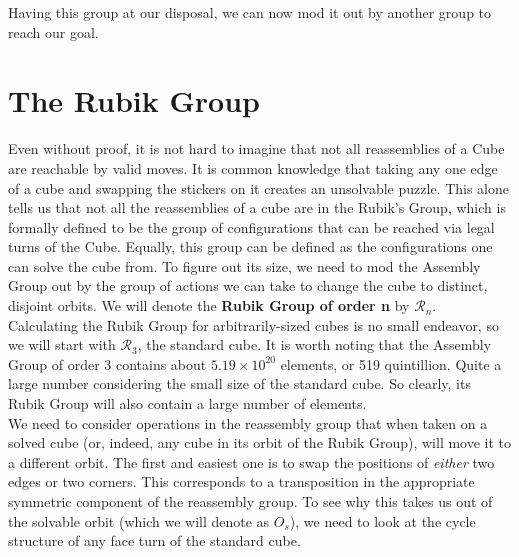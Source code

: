 \documentclass[10pt,letterpaper]{report}
\begin{document}
Having this group at our disposal, we can now mod it out by another group to reach our goal.
\section{The Rubik Group}
Even without proof, it is not hard to imagine that not all reassemblies of a Cube are reachable by valid moves.  It is common knowledge that taking any one edge of a cube and swapping the stickers on it creates an unsolvable puzzle.  This alone tells us that not all the reassemblies of a cube are in the Rubik's Group, which is formally defined to be the group of configurations that can be reached via legal turns of the Cube.  Equally, this group can be defined as the configurations one can solve the cube from.  To figure out its size, we need to mod the Assembly Group out by the group of actions we can take to change the cube to distinct, disjoint orbits.  We will denote the \textbf{Rubik Group of order n} by $\mathcal{R}_n$. \\

Calculating the Rubik Group for arbitrarily-sized cubes is no small endeavor, so we will start with $\mathcal{R}_3$, the standard cube.  It is worth noting that the Assembly Group of order 3 contains about $5.19 \times 10^{20}$ elements, or 519 quintillion.  Quite a large number considering the small size of the standard cube.  So clearly, its Rubik Group will also contain a large number of elements.\\

We need to consider operations in the reassembly group that when taken on a solved cube (or, indeed, any cube in its orbit of the Rubik Group), will move it to a different orbit.  The first and easiest one is to swap the positions of \textit{either} two edges or two corners.  This corresponds to a transposition in the appropriate symmetric component of the reassembly group.  To see why this takes us out of the solvable orbit (which we will denote as $O_s$), we need to look at the cycle structure of any face turn of the standard cube. \\
\end{document}

